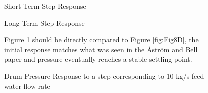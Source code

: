         \begin{figure}[ht]
            \begin{center}
                
                Short Term Step Response
                
                
                Long Term Step Response
                
                \caption{Drum Pressure Response to a step corresponding to 10 kg/s feed water flow rate}
                \label{fig:Valve_Open2B}
            \end{center}
            Figure \ref{fig:Valve_Open2B} should be directly compared to Figure \ref{fig:Fig8D}, the initial response matches what was seen in the \r{A}str\"{o}m and Bell paper and pressure eventually reaches a stable settling point.
        \end{figure}  %
        
